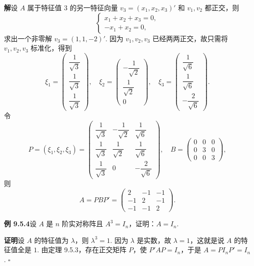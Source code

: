 \documentclass[UTF8, 12pt, fontset=fandol, oneside]{ctexart}
\begin{document}
\noindent\textbf{解}\quad 设 $A$ 属于特征值 $3$ 的另一特征向量 $v_3=(x_1,x_2,x_3)'$ 和 $v_1,v_2$ 都正交，则
\[
  \begin{cases}
    x_1+x_2+x_3=0,\\
    -x_1+x_2=0,
  \end{cases}
\]
求出一个非零解 $v_3=(1,1,-2)'$. 因为 $v_1,v_2,v_3$ 已经两两正交，故只需将 $v_1,v_2,v_3$ 标准化，得到
\[
  \xi_1=
  \left(\begin{array}{c}
    \dfrac1{\sqrt3}\\
    \dfrac1{\sqrt3}\\
    \dfrac1{\sqrt3}
  \end{array}\right),\quad
  \xi_2=
  \left(\begin{array}{c}
    -\dfrac1{\sqrt2}\\
    \dfrac1{\sqrt2}\\
    0
  \end{array}\right),\quad
  \xi_3=
  \left(\begin{array}{c}
    \dfrac1{\sqrt6}\\
    \dfrac1{\sqrt6}\\
    -\dfrac2{\sqrt6}
  \end{array}\right).
\]
令
\[
  P=(\xi_1,\xi_2,\xi_3)=
  \left(\begin{array}{ccc}
    \dfrac1{\sqrt3} & -\dfrac1{\sqrt2} & \dfrac1{\sqrt6}\\
    \dfrac1{\sqrt3} & \dfrac1{\sqrt2} & \dfrac1{\sqrt6}\\
    \dfrac1{\sqrt3} & 0 & -\dfrac2{\sqrt6}
  \end{array}\right),\quad
  B=
  \left(\begin{array}{ccc}
    0 & 0 & 0\\
    0 & 3 & 0\\
    0 & 0 & 3
  \end{array}\right),
\]
则
\[
  A=PBP'=
  \left(\begin{array}{ccc}
    2 & -1 & -1\\
    -1 & 2 & -1\\
    -1 & -1 & 2
  \end{array}\right).
\]

\noindent\textbf{例 9.5.4}\quad 设 $A$ 是 $n$ 阶实对称阵且 $A^3=I_n$，证明：$A=I_n$.

\noindent\textbf{证明}\quad 设 $A$ 的特征值为 $\lambda$，则 $\lambda^3=1$. 因为 $\lambda$ 是实数，故 $\lambda=1$，这就是说 $A$ 的特征值全是 $1$. 由定理 9.5.3，存在正交矩阵 $P$，使 $P'AP=I_n$，于是 $A=PI_nP'=I_n$. $\square$
\end{document}
